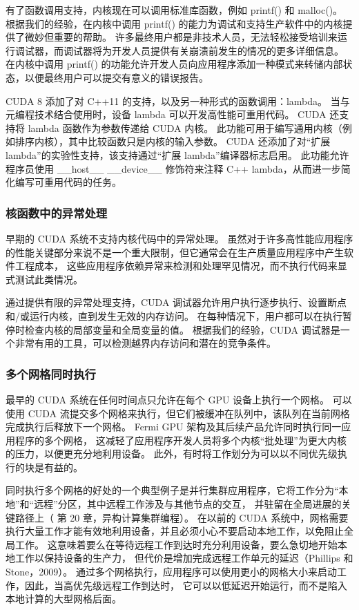 有了函数调用支持，内核现在可以调用标准库函数，例如 printf() 和 malloc()。 
根据我们的经验，在内核中调用 printf() 的能力为调试和支持生产软件中的内核提供了微妙但重要的帮助。 
许多最终用户都是非技术人员，无法轻松接受培训来运行调试器，而调试器将为开发人员提供有关崩溃前发生的情况的更多详细信息。 
在内核中调用 printf() 的功能允许开发人员向应用程序添加一种模式来转储内部状态，以便最终用户可以提交有意义的错误报告。

CUDA 8 添加了对 C++11 的支持，以及另一种形式的函数调用：lambda。 
当与元编程技术结合使用时，设备 lambda 可以开发高性能可重用代码。 CUDA 还支持将 lambda 函数作为参数传递给 CUDA 内核。 
此功能可用于编写通用内核（例如排序内核），其中比较函数只是内核的输入参数。 
CUDA 还添加了对“扩展 lambda”的实验性支持，该支持通过“扩展 lambda”编译器标志启用。 
此功能允许程序员使用 \_\_host\_\_ \_\_device\_\_ 修饰符来注释 C++ lambda，从而进一步简化编写可重用代码的任务。

\subsubsection{核函数中的异常处理}
早期的 CUDA 系统不支持内核代码中的异常处理。 
虽然对于许多高性能应用程序的性能关键部分来说不是一个重大限制，但它通常会在生产质量应用程序中产生软件工程成本，
这些应用程序依赖异常来检测和处理罕见情况，而不执行代码来显式测试此类情况。

通过提供有限的异常处理支持，CUDA 调试器允许用户执行逐步执行、设置断点和/或运行内核，直到发生无效的内存访问。 
在每种情况下，用户都可以在执行暂停时检查内核的局部变量和全局变量的值。 
根据我们的经验，CUDA 调试器是一个非常有用的工具，可以检测越界内存访问和潜在的竞争条件。

\subsubsection{多个网格同时执行}
最早的 CUDA 系统在任何时间点只允许在每个 GPU 设备上执行一个网格。 
可以使用 CUDA 流提交多个网格来执行，但它们被缓冲在队列中，该队列在当前网格完成执行后释放下一个网格。 
Fermi GPU 架构及其后续产品允许同时执行同一应用程序的多个网格，
这减轻了应用程序开发人员将多个内核“批处理”为更大内核的压力，以便更充分地利用设备。 
此外，有时将工作划分为可以以不同优先级执行的块是有益的。

同时执行多个网格的好处的一个典型例子是并行集群应用程序，它将工作分为“本地”和“远程”分区，其中远程工作涉及与其他节点的交互，
并驻留在全局进展的关键路径上（ 第 20 章，异构计算集群编程）。 
在以前的 CUDA 系统中，网格需要执行大量工作才能有效地利用设备，并且必须小心不要启动本地工作，以免阻止全局工作。 
这意味着要么在等待远程工作到达时充分利用设备，要么急切地开始本地工作以保持设备的生产力，
但代价是增加完成远程工作单元的延迟（Phillips 和 Stone，2009）。 
通过多个网格执行，应用程序可以使用更小的网格大小来启动工作，因此，当高优先级远程工作到达时，
它可以以低延迟开始运行，而不是陷入本地计算的大型网格后面。

